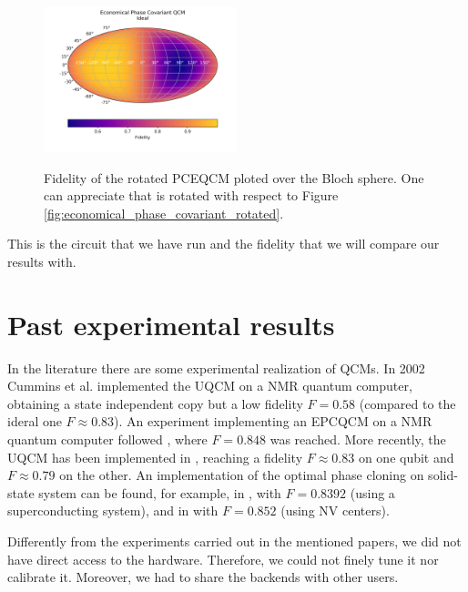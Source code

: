 \begin{figure}[H]
    \centering
            \includegraphics[width=0.5\textwidth]{Figures/economical_phase_covariant.png}
        \label{fig:economical_phase_covariant}
        \caption{Fidelity of the rotated PCEQCM ploted over the Bloch sphere. One can appreciate that is rotated with respect to Figure \ref{fig:economical_phase_covariant_rotated}.}
\end{figure}
This is the circuit that we have run and the fidelity that we will compare our results with.

\section{Past experimental results}
In the literature there are some experimental realization of QCMs. 
In 2002 Cummins et al. \cite{UQCMwithNMR} implemented the UQCM on a NMR quantum computer, obtaining a state independent copy but a low fidelity $F=0.58$ (compared to the ideral one $F \approx 0.83$).
An experiment implementing an EPCQCM on a NMR quantum computer followed \cite{EPCQCMwithNMR}, where $F=0.848$ was reached.
More recently, the UQCM has been implemented in \cite{UQCMwithSuperconducting}, reaching a fidelity $F\approx 0.83$ on one qubit and $F\approx 0.79$ on the other.
An implementation of the optimal phase cloning on solid-state system can be found, for example, in \cite{PCQCMwithSuperconducting}, with $F=0.8392$ (using a superconducting system), and in \cite{PCQCMwithNV} with $F=0.852$ (using NV centers).

Differently from the experiments carried out in the mentioned papers, we did not have direct access to the hardware. 
Therefore, we could not finely tune it nor calibrate it. Moreover, we had to share the backends with other users.
